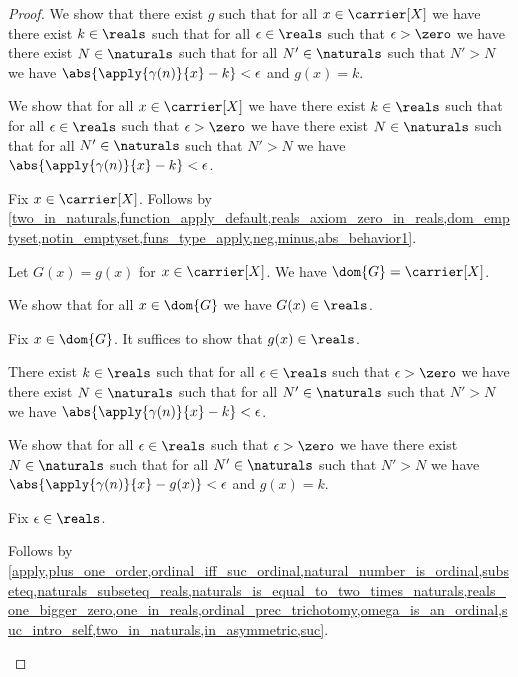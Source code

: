 \begin{proof}
    We show that there exist $g$ such that 
    for all $x \in \carrier[X]$ we have
    there exist $k \in \reals$ such that
    for all $\epsilon \in \reals$ such that $\epsilon > \zero$ we have
    there exist $N \in \naturals$ such that
    for all $N' \in \naturals$ such that $N' > N$ we have
    $\abs{\apply{\gamma(n)}{x} - k} < \epsilon$ and $g(x)= k$.
    \begin{subproof}       
        We show that for all $x \in \carrier[X]$ we have
        there exist $k \in \reals$ such that
        for all $\epsilon \in \reals$ such that $\epsilon > \zero$ we have
        there exist $N \in \naturals$ such that
        for all $N' \in \naturals$ such that $N' > N$ we have
        $\abs{\apply{\gamma(n)}{x} - k} < \epsilon$.
        \begin{subproof}
            Fix $x \in \carrier[X]$.
            Follows by \cref{two_in_naturals,function_apply_default,reals_axiom_zero_in_reals,dom_emptyset,notin_emptyset,funs_type_apply,neg,minus,abs_behavior1}.
        \end{subproof}
    \end{subproof}
    

    Let $G(x) = g(x)$ for $x \in \carrier[X]$.
    We have $\dom{G} = \carrier[X]$.

    We show that for all $x \in \dom{G}$ we have $G(x) \in \reals$.
    \begin{subproof}
        Fix $x \in \dom{G}$.
        It suffices to show that $g(x) \in \reals$.

        There exist $k \in \reals$ such that for all $\epsilon \in \reals$ such that $\epsilon > \zero$ we have there exist $N \in \naturals$ such that for all $N' \in \naturals$ such that $N' > N$ we have $\abs{\apply{\gamma(n)}{x} - k} < \epsilon$.

        We show that for all $\epsilon \in \reals$ such that $\epsilon > \zero$ we have there exist $N \in \naturals$ such that for all $N' \in \naturals$ such that $N' > N$ we have $\abs{\apply{\gamma(n)}{x} - g(x)} < \epsilon$ and $g(x)= k$.
        \begin{subproof}
            Fix $\epsilon \in \reals$.
        \end{subproof}

        
        

        Follows by \cref{apply,plus_one_order,ordinal_iff_suc_ordinal,natural_number_is_ordinal,subseteq,naturals_subseteq_reals,naturals_is_equal_to_two_times_naturals,reals_one_bigger_zero,one_in_reals,ordinal_prec_trichotomy,omega_is_an_ordinal,suc_intro_self,two_in_naturals,in_asymmetric,suc}.


\end{subproof}
\end{proof}
